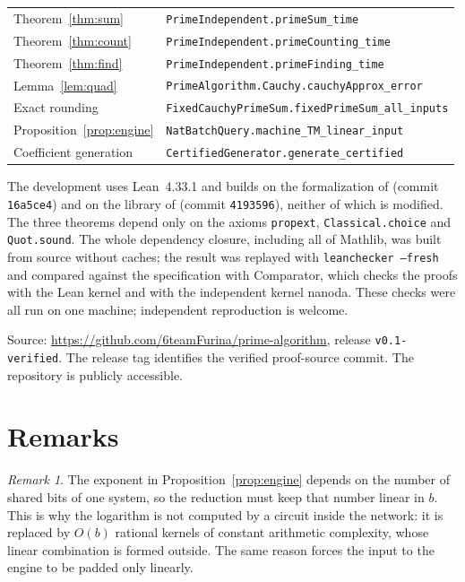 \documentclass[11pt]{amsart}
\theoremstyle{remark}
\newtheorem{remark}[theorem]{Remark}
\newcommand{\lean}[1]{\texttt{#1}}
\begin{document}
\smallskip
\begin{center}
\begin{tabular}{ll}
Theorem~\ref{thm:sum} & \lean{PrimeIndependent.primeSum\_time} \\
Theorem~\ref{thm:count} & \lean{PrimeIndependent.primeCounting\_time} \\
Theorem~\ref{thm:find} & \lean{PrimeIndependent.primeFinding\_time} \\
Lemma~\ref{lem:quad} & \lean{PrimeAlgorithm.Cauchy.cauchyApprox\_error} \\
Exact rounding & \lean{FixedCauchyPrimeSum.fixedPrimeSum\_all\_inputs} \\
Proposition~\ref{prop:engine} &
  \lean{NatBatchQuery.machine\_TM\_linear\_input} \\
Coefficient generation & \lean{CertifiedGenerator.generate\_certified} \\
\end{tabular}
\end{center}
\smallskip

The development uses Lean~4.33.1 and builds on the formalization of
\cite{A} (commit \lean{16a5ce4}) and on the library of \cite{T1} (commit
\lean{4193596}), neither of which is modified.  The three theorems depend
only on the axioms \lean{propext}, \lean{Classical.choice} and
\lean{Quot.sound}.  The whole dependency closure, including all of Mathlib,
was built from source without caches; the result was replayed with
\lean{leanchecker --fresh} and compared against the specification with
Comparator, which checks the proofs with the Lean kernel and with the
independent kernel nanoda.  These checks were all run on one machine;
independent reproduction is welcome.

\smallskip\noindent
Source: \url{https://github.com/6teamFurina/prime-algorithm},
release \texttt{v0.1-verified}.  The release tag identifies the verified
proof-source commit.  The repository is publicly accessible.

\section{Remarks}

\begin{remark}
The exponent in Proposition~\ref{prop:engine} depends on the number of shared
bits of one system, so the reduction must keep that number linear in $b$.
This is why the logarithm is not computed by a circuit inside the network:
it is replaced by $O(b)$ rational kernels of constant arithmetic complexity,
whose linear combination is formed outside.  The same reason forces the
input to the engine to be padded only linearly.
\end{remark}
\end{document}
